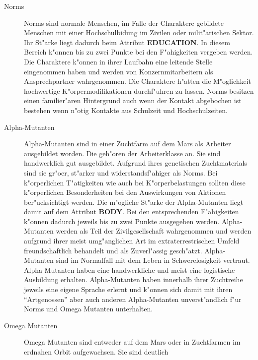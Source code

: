 \begin{description}
    \item[Norms] Norms sind normale Menschen, im Falle der Charaktere gebildete Menschen mit einer Hochschulbidung im Zivilen oder 
        milit"arischen Sektor. Ihr St"arke liegt dadurch beim Attribut \textbf{EDUCATION}. In diesem Bereich k"onnen bis zu zwei Punkte bei den F"ahigkeiten vergeben werden. Die Charaktere k"onnen in ihrer Laufbahn eine leitende Stelle eingenommen haben und werden von Konzernmitarbeitern als Ansprechpartner wahrgenommen. Die Charaktere h"atten die M"oglichkeit hochwertige K"orpermodifikationen durchf"uhren zu lassen. Norms besitzen einen familier"aren Hintergrund auch wenn der Kontakt abgebochen ist bestehen wenn n"otig Kontakte aus Schulzeit und Hochschulzeiten.
    \item[Alpha-Mutanten] Alpha-Mutanten sind in einer Zuchtfarm auf dem Mars als Arbeiter ausgebildet worden. Die geh"oren der
        Arbeiterklasse an. Sie sind handwerklich gut ausgebildet. Aufgrund ihres genetischen Zuchtmaterials sind sie gr"o\3er, st"arker und widerstandsf"ahiger als Norms. Bei k"orperlichen T"atigkeiten wie auch bei K"orperbelastungen sollten diese k"orperlichen Besonderheiten bei den Auswirkungen von Aktionen ber"ucksichtigt werden. Die m"ogliche St"arke der Alpha-Mutanten liegt damit auf dem Attribut \textbf{BODY}. Bei den entsprechenden F"ahigkeiten k"onnen dadurch jeweils bis zu zwei Punkte ausgegeben werden. Alpha-Mutanten werden als Teil der Zivilgesellschaft wahrgenommen und werden aufgrund ihrer meist umg"anglichen Art im extraterrestrischen Umfeld freundschaftlich behandelt und als Zuverl"assig gesch"atzt. Alpha-Mutanten sind im Normalfall mit dem Leben in Schwerelosigkeit vertraut. Alpha-Mutanten haben eine handwerkliche und meist eine logistische Ausbildung erhalten. Alpha-Mutanten haben innerhalb ihrer Zuchtreihe jeweils eine eigene Sprache erlernt und k"onnen sich damit mit ihren "`Artgenossen"' aber auch anderen Alpha-Mutanten unverst"andlich f"ur Norms und Omega Mutanten unterhalten. 
    \item[Omega Mutanten] Omega Mutanten sind entweder auf dem Mars oder in Zuchtfarmen im erdnahen Orbit aufgewachsen. Sie sind deutlich   

\end{description}
